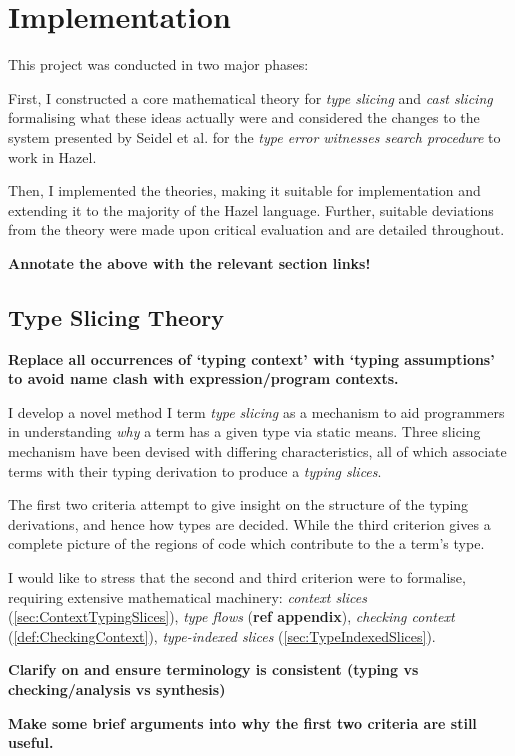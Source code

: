 \chapter{Implementation}\label{chap:Implementation}
This project was conducted in two major phases:

First, I constructed a core mathematical theory for \textit{type slicing} and \textit{cast slicing} formalising what these ideas actually were and considered the changes to the system presented by Seidel et al. for the \textit{type error witnesses search procedure} to work in Hazel.  

Then, I implemented the theories, making it suitable for implementation and extending it to the majority of the Hazel language. Further, suitable deviations from the theory were made upon critical evaluation and are detailed throughout.

\textbf{Annotate the above with the relevant section links!}
\section{Type Slicing Theory}\label{sec:TypeSlicingTheory}
\textbf{Replace all occurrences of `typing context' with `typing assumptions' to avoid name clash with expression/program contexts.}

I develop a novel method I term \textit{type slicing} as a mechanism to aid programmers in understanding \textit{why} a term has a given type via static means. Three slicing mechanism have been devised with differing characteristics, all of which associate terms with their typing derivation to produce a \textit{typing slices}. 

The first two criteria attempt to give insight on the structure of the typing derivations, and hence how types are decided. While the third criterion gives a complete picture of the regions of code which contribute to the a term's type.

I would like to stress that the second and third criterion were  to formalise, requiring extensive mathematical machinery: \textit{context slices} (\cref{sec:ContextTypingSlices}), \textit{type flows} (\textbf{ref appendix}), \textit{checking context} (\cref{def:CheckingContext}), \textit{type-indexed slices} (\cref{sec:TypeIndexedSlices}).

\textbf{Clarify on and ensure terminology is consistent (typing vs checking/analysis vs synthesis)}

\textbf{Make some brief arguments into why the first two criteria are still useful.}

